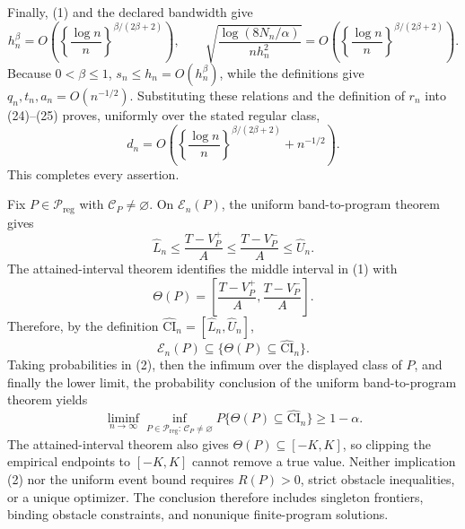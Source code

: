 Finally, (1) and the declared bandwidth give
\[
 h_n^\beta
 =O\!\left(\left\{\frac{\log n}{n}\right\}^{\beta/(2\beta+2)}\right),
 \qquad
 \sqrt{\frac{\log(8N_n/\alpha)}{nh_n^2}}
 =O\!\left(\left\{\frac{\log n}{n}\right\}^{\beta/(2\beta+2)}\right).       \tag{26}
\]
Because \(0<\beta\le1\), \(s_n\le h_n=O(h_n^\beta)\), while the definitions give \(q_n,t_n,a_n=O(n^{-1/2})\).  Substituting these relations and the definition of \(r_n\) into (24)--(25) proves, uniformly over the stated regular class,
\[
 d_n=O\!\left(\left\{\frac{\log n}{n}\right\}^{\beta/(2\beta+2)}+n^{-1/2}\right).
\]
This completes every assertion.

Fix \(P\in\mathcal P_{\mathrm{reg}}\) with \(\mathcal C_P\ne\varnothing\).  On \(\mathcal E_n(P)\), the uniform band-to-program theorem gives
\[
 \widehat L_n
 \le \frac{T-V_P^+}{A}
 \le \frac{T-V_P^-}{A}
 \le \widehat U_n.                                                               \tag{1}
\]
The attained-interval theorem identifies the middle interval in (1) with
\[
 \Theta(P)=\left[\frac{T-V_P^+}{A},\frac{T-V_P^-}{A}\right].
\]
Therefore, by the definition \(\widehat{\mathrm{CI}}_n=[\widehat L_n,\widehat U_n]\),
\[
 \mathcal E_n(P)
 \subseteq
 \{\Theta(P)\subseteq\widehat{\mathrm{CI}}_n\}.                                \tag{2}
\]
Taking probabilities in (2), then the infimum over the displayed class of \(P\), and finally the lower limit, the probability conclusion of the uniform band-to-program theorem yields
\[
 \liminf_{n\to\infty}
 \inf_{P\in\mathcal P_{\mathrm{reg}}:\,\mathcal C_P\ne\varnothing}
 P\{\Theta(P)\subseteq\widehat{\mathrm{CI}}_n\}
 \ge1-\alpha.
\]
The attained-interval theorem also gives \(\Theta(P)\subseteq[-K,K]\), so clipping the empirical endpoints to \([-K,K]\) cannot remove a true value.  Neither implication (2) nor the uniform event bound requires \(R(P)>0\), strict obstacle inequalities, or a unique optimizer.  The conclusion therefore includes singleton frontiers, binding obstacle constraints, and nonunique finite-program solutions.
